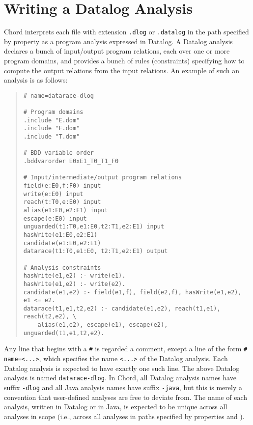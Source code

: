 \section{Writing a Datalog Analysis}
\label{sec:writing-datalog-analysis}

Chord interprets each file with extension {\tt .dlog} or {\tt .datalog} in the path specified by
property  as a program analysis expressed in Datalog.
A Datalog analysis declares a bunch of input/output program relations,
each over one or more program domains, and provides a bunch of rules (constraints)
specifying how to compute the output relations from the input relations.
An example of such an analysis is as follows:

\begin{quote}
\begin{verbatim}
# name=datarace-dlog

# Program domains
.include "E.dom"
.include "F.dom"
.include "T.dom"

# BDD variable order
.bddvarorder E0xE1_T0_T1_F0

# Input/intermediate/output program relations
field(e:E0,f:F0) input
write(e:E0) input
reach(t:T0,e:E0) input
alias(e1:E0,e2:E1) input
escape(e:E0) input
unguarded(t1:T0,e1:E0,t2:T1,e2:E1) input
hasWrite(e1:E0,e2:E1)
candidate(e1:E0,e2:E1) 
datarace(t1:T0,e1:E0, t2:T1,e2:E1) output

# Analysis constraints
hasWrite(e1,e2) :- write(e1).
hasWrite(e1,e2) :- write(e2).
candidate(e1,e2) :- field(e1,f), field(e2,f), hasWrite(e1,e2), e1 <= e2.
datarace(t1,e1,t2,e2) :- candidate(e1,e2), reach(t1,e1), reach(t2,e2), \
    alias(e1,e2), escape(e1), escape(e2), unguarded(t1,e1,t2,e2).
\end{verbatim}
\end{quote}

Any line that begins with a {\tt \#} is regarded a comment, except a
line of the form {\tt \#} {\tt name=<...>}, which specifies the name
{\tt <...>} of the Datalog analysis.
Each Datalog analysis is expected to have exactly one such line.
The above Datalog analysis is named {\tt datarace-dlog}.
In Chord, all Datalog analysis names have suffix
{\tt -dlog} and all Java analysis names have suffix {\tt -java}, but
this is merely a convention that user-defined analyses are free to deviate from.
The name of each analysis, written in Datalog or in Java, is expected to be
unique across all analyses in scope (i.e., across all analyses in paths
specified by properties \code{chord.dlog.analysis.path} and ).

